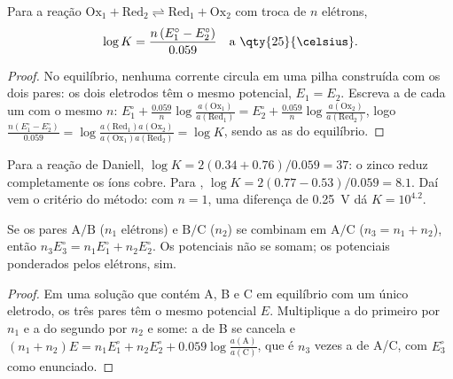 \begin{proposition}\label{prop:b1:nernst:equilibrium-constant}
Para a reação $\mathrm{Ox_1} + \mathrm{Red_2} \rightleftharpoons
\mathrm{Red_1} + \mathrm{Ox_2}$ com troca de $n$ elétrons,
\[
  \log K = \frac{n\,(E^\circ_1 - E^\circ_2)}{0.059}\quad\text{a \qty{25}{\celsius}} .
\]
\end{proposition}

\begin{proof}
No equilíbrio, nenhuma corrente circula em uma pilha construída com os
dois pares: os dois eletrodos têm o mesmo potencial, $E_1 = E_2$.
Escreva a  de cada um com o mesmo $n$: $E^\circ_1 + \frac{0.059}{n}\log
\frac{a(\mathrm{Ox_1})}{a(\mathrm{Red_1})} = E^\circ_2 + \frac{0.059}{n}\log
\frac{a(\mathrm{Ox_2})}{a(\mathrm{Red_2})}$, logo $\frac{n(E^\circ_1 -
E^\circ_2)}{0.059} = \log\frac{a(\mathrm{Red_1})a(\mathrm{Ox_2})}{a(\mathrm{Ox_1})
a(\mathrm{Red_2})} = \log K$, sendo as  as do equilíbrio.
\end{proof}

Para a reação de Daniell, $\log K = 2(0.34 + 0.76)/0.059 = 37$: o zinco
reduz completamente os íons cobre. Para ,
$\log K = 2(0.77 - 0.53)/0.059 = 8.1$. Daí vem o critério do método:
com $n = 1$, uma diferença de \qty{0.25}{V} dá $K = 10^{4.2}$.

\begin{proposition}\label{prop:b1:nernst:combined-potentials}
Se os pares $\mathrm{A}/\mathrm{B}$ ($n_1$ elétrons) e
$\mathrm{B}/\mathrm{C}$ ($n_2$) se combinam em $\mathrm{A}/\mathrm{C}$
($n_3 = n_1 + n_2$), então $n_3 E^\circ_3 = n_1 E^\circ_1 + n_2 E^\circ_2$.
Os potenciais não se somam; os potenciais ponderados pelos elétrons, sim.
\end{proposition}

\begin{proof}
Em uma solução que contém A, B e C em equilíbrio com um único eletrodo,
os três pares têm o mesmo potencial $E$. Multiplique a 
do primeiro por $n_1$ e a do segundo por $n_2$ e some: a  de B
se cancela e $(n_1 + n_2)E = n_1E^\circ_1 + n_2E^\circ_2 +
0.059\log\frac{a(\mathrm{A})}{a(\mathrm{C})}$, que é $n_3$ vezes a
 de A/C, com $E^\circ_3$ como enunciado.
\end{proof}

